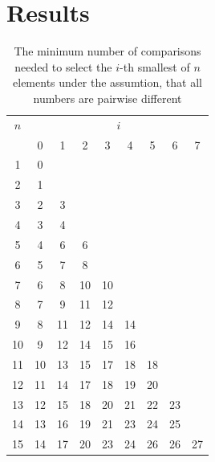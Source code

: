 \documentclass[10pt,journal,compsoc]{IEEEtran}
\begin{document}
\section{Results}

\begin{table}[!t]
  \renewcommand{\arraystretch}{1.2}
  \caption{The minimum number of comparisons needed to select the $i$-th smallest of $n$ elements under the assumtion, that all numbers are pairwise different}
  \label{table:num-comparisons}
  \centering
  \begin{tabular}{c|cccccccc}
    $n$ & \multicolumn{8}{c}{$i$}                                    \\
        & 0                       & 1  & 2  & 3  & 4  & 5  & 6  & 7  \\ \hline
    1   & 0                                                          \\
    2   & 1                                                          \\
    3   & 2                       & 3                                \\
    4   & 3                       & 4                                \\
    5   & 4                       & 6  & 6                           \\
    6   & 5                       & 7  & 8                           \\
    7   & 6                       & 8  & 10 & 10                     \\
    8   & 7                       & 9  & 11 & 12                     \\
    9   & 8                       & 11 & 12 & 14 & 14                \\
    10  & 9                       & 12 & 14 & 15 & 16                \\
    11  & 10                      & 13 & 15 & 17 & 18 & 18           \\
    12  & 11                      & 14 & 17 & 18 & 19 & 20           \\
    13  & 12                      & 15 & 18 & 20 & 21 & 22 & 23      \\
    14  & 13                      & 16 & 19 & 21 & 23 & 24 & 25      \\
    15  & 14                      & 17 & 20 & 23 & 24 & 26 & 26 & 27 \\
  \end{tabular}
\end{table}
\end{document}

